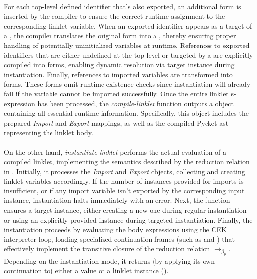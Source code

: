 		\paragraph{}%
			For each top-level defined identifier that's also exported, an additional  form is inserted by the compiler to ensure the correct runtime assignment to the corresponding linklet variable. When an exported identifier appears as a target of a , the compiler translates the original form into a , thereby ensuring proper handling of potentially uninitialized variables at runtime. References to exported identifiers that are either undefined at the top level or targeted by a  are explicitly compiled into  forms, enabling dynamic resolution via target instance during instantiation. Finally, references to imported variables are transformed into  forms. These forms omit runtime existence checks since instantiation will already fail if the variable cannot be imported successfully. Once the entire linklet s-expression has been processed, the \emph{compile-linklet} function outputs a  object containing all essential runtime information. Specifically, this object includes the prepared \emph{Import} and \emph{Export} mappings, as well as the compiled Pycket \gls{ast} representing the linklet body.

		\paragraph{}%
			On the other hand, \emph{instantiate-linklet} performs the actual evaluation of a compiled linklet, implementing the semantics described by the reduction relation in . Initially, it processes the \emph{Import} and \emph{Export} objects, collecting and creating linklet variables accordingly. If the number of instances provided for imports is insufficient, or if any import variable isn't exported by the corresponding input instance, instantiation halts immediately with an error. Next, the function ensures a target instance, either creating a new one during regular instantiation or using an explicitly provided instance during targeted instantiation. Finally, the instantiation proceeds by evaluating the body expressions using the CEK interpreter loop, loading specialized continuation frames (such as  and ) that effectively implement the transitive closure of the reduction relation $\longrightarrow_{\beta_p}$. Depending on the instantiation mode, it returns (by applying its own continuation to) either a value or a linklet instance ().

